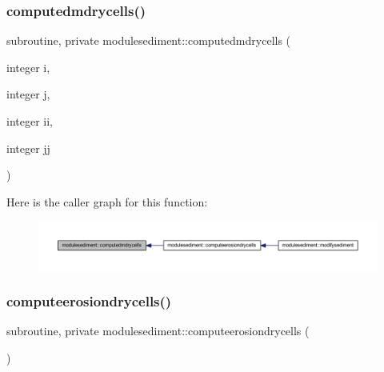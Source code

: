 \subsubsection{\texorpdfstring{computedmdrycells()}{computedmdrycells()}}
{\footnotesize\ttfamily subroutine, private modulesediment\+::computedmdrycells (\begin{DoxyParamCaption}\item[{integer}]{i,  }\item[{integer}]{j,  }\item[{integer}]{ii,  }\item[{integer}]{jj }\end{DoxyParamCaption})\hspace{0.3cm}{\ttfamily [private]}}

Here is the caller graph for this function\+:\nopagebreak
\begin{figure}[H]
\begin{center}
\leavevmode
\includegraphics[width=350pt]{namespacemodulesediment_a299a31086ad8f844252db856c26e1ce7_icgraph}
\end{center}
\end{figure}
\mbox{\label{namespacemodulesediment_a8f039d145535e96ceb83a4518f8f82a6}} 
\subsubsection{\texorpdfstring{computeerosiondrycells()}{computeerosiondrycells()}}
{\footnotesize\ttfamily subroutine, private modulesediment\+::computeerosiondrycells (\begin{DoxyParamCaption}{ }\end{DoxyParamCaption})\hspace{0.3cm}{\ttfamily [private]}}

